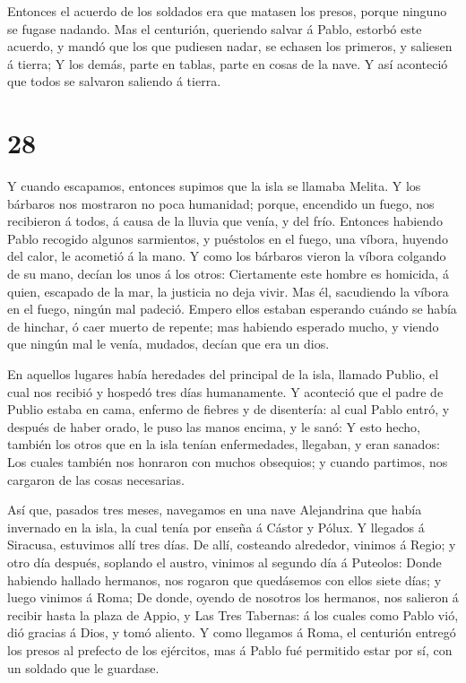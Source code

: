  Entonces el acuerdo de los soldados era que matasen los
presos, porque ninguno se fugase nadando.  Mas el
centurión, queriendo salvar á Pablo, estorbó este acuerdo, y mandó que
los que pudiesen nadar, se echasen los primeros, y saliesen á tierra;
 Y los demás, parte en tablas, parte en cosas de la nave. Y
así aconteció que todos se salvaron saliendo á tierra.

\hypertarget{section-27}{%
\section{28}\label{section-27}}

 Y cuando escapamos, entonces supimos que la isla se llamaba
Melita.  Y los bárbaros nos mostraron no poca humanidad;
porque, encendido un fuego, nos recibieron á todos, á causa de la lluvia
que venía, y del frío.  Entonces habiendo Pablo recogido
algunos sarmientos, y puéstolos en el fuego, una víbora, huyendo del
calor, le acometió á la mano.  Y como los bárbaros vieron la
víbora colgando de su mano, decían los unos á los otros: Ciertamente
este hombre es homicida, á quien, escapado de la mar, la justicia no
deja vivir.  Mas él, sacudiendo la víbora en el fuego,
ningún mal padeció.  Empero ellos estaban esperando cuándo
se había de hinchar, ó caer muerto de repente; mas habiendo esperado
mucho, y viendo que ningún mal le venía, mudados, decían que era un
dios.

 En aquellos lugares había heredades del principal de la
isla, llamado Publio, el cual nos recibió y hospedó tres días
humanamente.  Y aconteció que el padre de Publio estaba en
cama, enfermo de fiebres y de disentería: al cual Pablo entró, y después
de haber orado, le puso las manos encima, y le sanó:  Y esto
hecho, también los otros que en la isla tenían enfermedades, llegaban, y
eran sanados:  Los cuales también nos honraron con muchos
obsequios; y cuando partimos, nos cargaron de las cosas necesarias.

 Así que, pasados tres meses, navegamos en una nave
Alejandrina que había invernado en la isla, la cual tenía por enseña á
Cástor y Pólux.  Y llegados á Siracusa, estuvimos allí tres
días.  De allí, costeando alrededor, vinimos á Regio; y
otro día después, soplando el austro, vinimos al segundo día á Puteolos:
 Donde habiendo hallado hermanos, nos rogaron que
quedásemos con ellos siete días; y luego vinimos á Roma; 
De donde, oyendo de nosotros los hermanos, nos salieron á recibir hasta
la plaza de Appio, y Las Tres Tabernas: á los cuales como Pablo vió, dió
gracias á Dios, y tomó aliento.  Y como llegamos á Roma, el
centurión entregó los presos al prefecto de los ejércitos, mas á Pablo
fué permitido estar por sí, con un soldado que le guardase.

